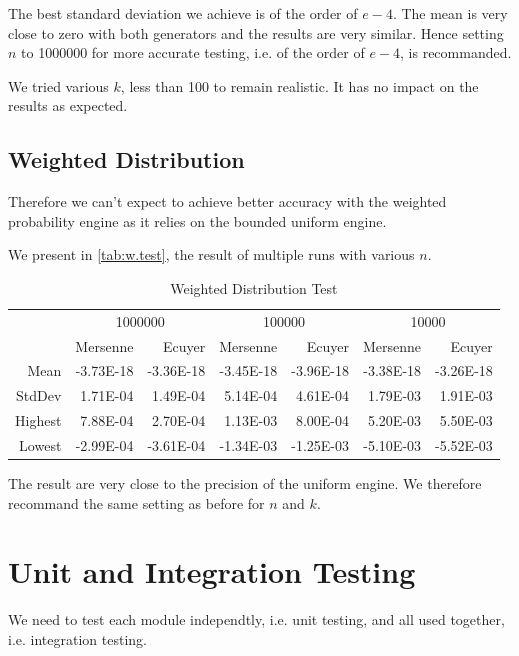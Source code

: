 \documentclass[12pt,a4paper,titlepage]{article}
\begin{document}
The best standard deviation we achieve is of the order of $e-4$.
The mean is very close to zero with both generators and the results 
are very similar.
Hence setting $n$ to 1000000 for more accurate testing, 
i.e. of the order of $e-4$, is recommanded.

We tried various $k$, less than 100 to remain realistic. It has no impact on the
results as expected.

\subsection{Weighted Distribution}

Therefore we can't expect to achieve better accuracy with the
weighted probability engine as it relies on the bounded uniform engine.

We present in \autoref{tab:w.test}, the result of multiple runs with various $n$.
\begin{table}[htbp!]
  \centering \tiny
    \begin{tabular}{r|rrrrrr}
    \multicolumn{1}{r}{} & \multicolumn{2}{c}{1000000} & \multicolumn{2}{c}{100000} & \multicolumn{2}{c}{10000} \\
    \multicolumn{1}{r}{} & Mersenne & Ecuyer & Mersenne & Ecuyer & Mersenne & Ecuyer \\
\cmidrule{2-7}    Mean  & -3.73E-18 & -3.36E-18 & -3.45E-18 & -3.96E-18 & -3.38E-18 & -3.26E-18 \\
    StdDev  & 1.71E-04 & 1.49E-04 & 5.14E-04 & 4.61E-04 & 1.79E-03 & 1.91E-03 \\
    Highest  & 7.88E-04 & 2.70E-04 & 1.13E-03 & 8.00E-04 & 5.20E-03 & 5.50E-03 \\
    Lowest  & -2.99E-04 & -3.61E-04 & -1.34E-03 & -1.25E-03 & -5.10E-03 & -5.52E-03 \\
    \end{tabular}%
  \caption{Weighted Distribution Test}
  \label{tab:w.test}%
\end{table}%
The result are very close to the precision of the uniform engine. 
We therefore recommand the same setting as before for $n$ and $k$.

\section{Unit and Integration Testing}
We need to test each module independtly, i.e. unit testing, and all used 
together, i.e. integration testing.
\end{document}
